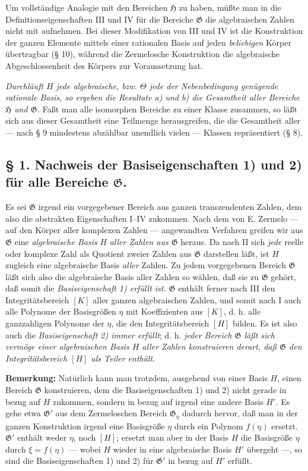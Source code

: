 Um vollständige Analogie mit den Bereichen $\mathfrak H$ zu haben, müßte man
in die Definitionseigenschaften III und IV für die Bereiche $\mathfrak G$ die
algebraischen Zahlen nicht mit aufnehmen. Bei dieser Modifikation von III und
IV ist die Konstruktion der ganzen Elemente mittels einer rationalen Basis auf
jeden \emph{beliebigen} Körper übertragbar (§ 10), während die Zermelosche
Konstruktion die algebraische Abgeschlossenheit des Körpers zur Voraussetzung
hat.

\emph{Durchläuft $H$ jede algebraische, bzw. $\Theta$ jede der Nebenbedingung
genügende rationale Basis, so ergeben die Resultate a) und b) die Gesamtheit
aller Bereiche $\mathfrak H$ und $\mathfrak G$.} Faßt man alle isomorphen
Bereiche zu einer Klasse zusammen, so läßt sich aus dieser Gesamtheit eine
Teilmenge herausgreifen, die die Gesamtheit aller --- nach § 9 mindestens
abzählbar unendlich vielen --- Klassen repräsentiert (§ 8).

\subsection*{§ 1. Nachweis der Basiseigenschaften 1) und 2) für alle Bereiche
$\mathfrak G$.}

Es sei $\mathfrak G$ irgend ein vorgegebener Bereich aus ganzen transzendenten
Zahlen, dem also die abstrakten Eigenschaften I--IV zukommen. Nach dem von
E. Zermelo --- auf den Körper aller komplexen Zahlen --- angewandten Verfahren
greifen wir aus $\mathfrak G$ eine \emph{algebraische Basis} $H$ \emph{aller
Zahlen aus $\mathfrak G$} heraus. Da nach II sich \emph{jede} reelle oder
komplexe Zahl als Quotient zweier Zahlen aus $\mathfrak G$ darstellen läßt, ist
$H$ zugleich eine algebraische Basis \emph{aller} Zahlen. Zu jedem vorgegebenen
Bereich $\mathfrak G$ läßt sich also die algebraische Basis aller Zahlen so
wählen, daß sie zu $\mathfrak G$ gehört, daß somit die \emph{Basiseigenschaft 1)
erfüllt ist.} $\mathfrak G$ enthält ferner nach III den Integritätsbereich $[K]$
aller ganzen algebraischen Zahlen, und somit nach I auch alle Polynome der
Basisgrößen $\eta$ mit Koeffizienten aus $[K]$, d. h. alle ganzzahligen Polynome
der $\eta$, die den Integritätsbereich $[H]$ bilden. Es ist also auch die
\emph{Basiseigenschaft 2) immer erfüllt}; d. h. \emph{jeder Bereich
$\mathfrak G$ läßt sich vermöge einer algebraischen Basis $H$ aller Zahlen
konstruieren derart, daß $\mathfrak G$ den Integritätsbereich $[H]$ als Teiler
enthält.}

\textbf{Bemerkung:} Natürlich kann man trotzdem, ausgehend von einer Basis $H$,
einen Bereich $\mathfrak G$ konstruieren, dem die Basiseigenschaften 1) und 2)
nicht gerade in bezug auf $H$ zukommen, sondern in bezug auf irgend eine andere
Basis $H'$. Es gehe etwa $\mathfrak G'$ aus dem Zermeloschen Bereich
$\mathfrak G_\eta$ dadurch hervor, daß man in der ganzen Konstruktion irgend
eine Basisgröße $\eta$ durch ein Polynom $f(\eta)$ ersetzt. $\mathfrak G'$
enthält weder $\eta$, noch $[H]$; ersetzt man aber in der Basis $H$ die
Basisgröße $\eta$ durch $\xi=f(\eta)$ --- wobei $H$ wieder in eine algebraische
Basis $H'$ übergeht ---, so sind die Basiseigenschaften 1) und 2) für
$\mathfrak G'$ in bezug auf $H'$ erfüllt.

